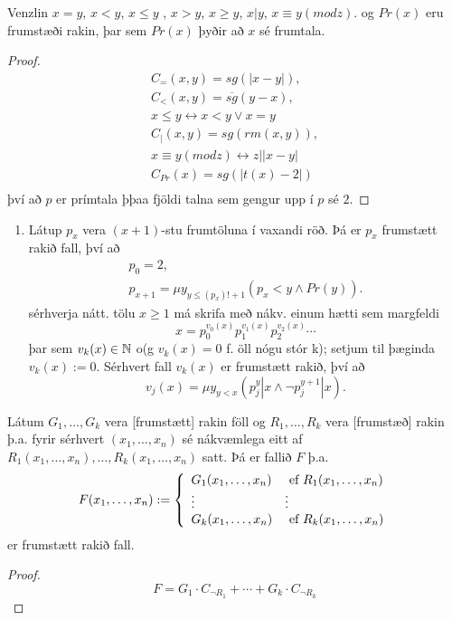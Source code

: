 \documentclass[12pt]{book}
\newcommand{\xxn}{x_1, \dotsc, x_n}
\begin{document}
\begin{setn}
  Venzlin $x = y$, $x < y$, $x \leq y$ , $x > y$, $x \geq y$, $x | y$, $x \equiv y (mod z)$.
  og $Pr(x)$ eru frumstæði rakin, þar sem $Pr(x)$ þyðir að $x$ sé frumtala.
  \begin{proof}
    \begin{gather*}
      C_=(x,y) = sg(|x-y|),\\
      C_<(x,y) = \overline{sg}(y - x),\\
      x \leq y \leftrightarrow x < y \vee x = y\\
      C_|(x,y) = sg(rm(x,y)),\\
      x \equiv y (mod z) \leftrightarrow z | |x-y|\\
      C_{Pr} (x) = sg(|t(x)-2|)\\
    \end{gather*}
    því að $p$ er prímtala þþaa fjöldi talna sem gengur upp í $p$ sé $2$.
  \end{proof}
\end{setn}

\begin{daemi}
  \begin{enumerate}[(1)]
  \item Látup $p_x$ vera $(x+1)$-stu frumtöluna í vaxandi röð. Þá
    er $p_x$ frumstætt rakið fall, því að
    \begin{gather*}
      p_0 = 2,\\
      p_{x+1} = \mu y_{y \leq (p_x)!+1} (p_x < y \wedge Pr(y)).
    \end{gather*}
    sérhverja nátt. tölu $x\geq 1$ má skrifa með
    nákv. einum hætti sem margfeldi
    \[ x = p_0^{v_0(x)} p_1^{v_1(x)} p_2^{v_2(x)} \dotsb \]
    þar sem $v_k(x) \in \mathbb{N}$ o(g $v_k(x) = 0$ f. öll nógu stór k);
    setjum til þæginda
    $v_k(x) := 0$. Sérhvert fall $v_k(x)$ er frumstætt rakið, því að
    \[ v_j(x) = \mu y_{y < x}(p_j^y | x \wedge \lnot p_j^{y+1} | x).\]
  \end{enumerate}
\end{daemi}

\begin{setn}
 Látum $G_1, \dotsc, G_k$ vera [frumstætt] rakin föll og $R_1, \dotsc, R_k$ vera
 [frumstæð] rakin þ.a. fyrir sérhvert $(\xxn)$ sé nákvæmlega eitt
 af $R_1(\xxn), \dotsc, R_k(\xxn)$ satt. Þá er fallið $F$ þ.a.
 \[ F(\xxn) := \bcondef G_1(\xxn) & \Ef R_1(\xxn)\\ \vdots & \vdots \\ G_k(\xxn) & \Ef R_k(\xxn) \econdef \]
 er frumstætt rakið fall.
 \begin{proof}
   \[F = G_1 \cdot C_{\lnot R_1} + \dotsb + G_k \cdot C_{\lnot R_k} \]
 \end{proof}
\end{setn}
\end{document}
